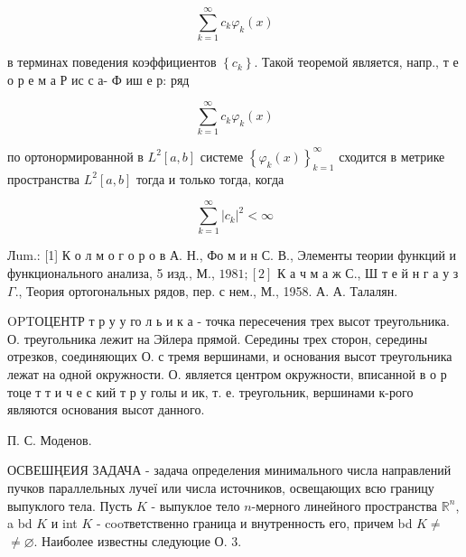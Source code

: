 \documentclass[10pt]{article}
\begin{document}
\[

\sum_{k=1}^{\infty} c_{k} \varphi_{k}(x)

\]



в терминах поведения коэффициентов $\left\{c_{k}\right\}$. Такой теоремой является, напр., т е о р е м а Р ис с а- Ф иш е р: ряд



\[

\sum_{k=1}^{\infty} c_{k} \varphi_{k}(x)

\]



по ортонормированной в $L^{2}[a, b]$ системе $\left\{\varphi_{k}(x)\right\}_{k=1}^{\infty}$ сходится в метрике пространства $L^{2}[a, b]$ тогда и только тогда, когда



\[

\sum_{k=1}^{\infty}\left|c_{k}\right|^{2}<\infty

\]



Лum.: [1] К о л м о г о р о в А. Н., Фо м и н С. В., Элементы теории функций и функционального анализа, 5 изд., М., $1981 ;[2]$ К а ч м а ж С., Ш т е й н г а у з $\Gamma$., Теория ортогональных рядов, пер. с нем., М., 1958. А. А. Талалян.



OPTОЦЕНТР т р у у го л ь и к а - точка пересечения трех высот треугольника. О. треугольника лежит на Эйлера прямой. Середины трех сторон, середины отрезков, соединяющих О. с тремя вершинами, и основания высот треугольника лежат на одной окружности. О. является центром окружности, вписанной в о р тоце т т и ч е с кий т р у голы и ик, т. е. треугольник, вершинами к-рого являются основания высот данного.



П. С. Моденов.



ОСВЕШҢЕИЯ ЗАДАЧА - задача определения минимального числа направлений пучков параллельных лучеї или числа источников, освещающих всю границу выпуклого тела. Пусть $K$ - выпуклое тело $n$-мерного линейного пространства $\mathbb{R}^{n}$, a bd $K$ и int $K$ - cooтветственно граница и внутренность его, причем bd $K \neq$ $\neq \varnothing$. Наиболее известны следуюцие О. 3.
\end{document}
